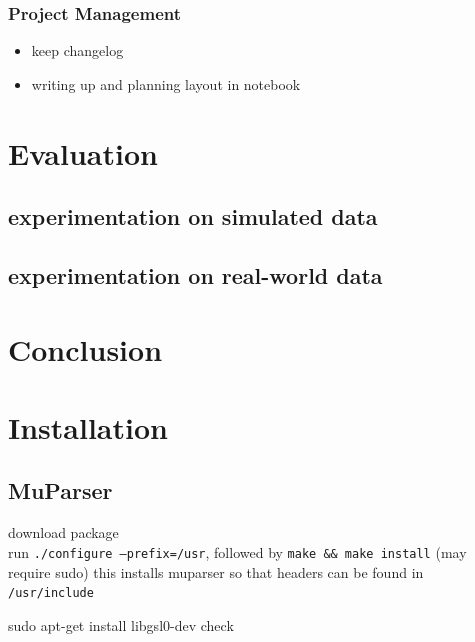 \documentclass[a4paper,11pt]{article}
\begin{document}
\subsubsection{Project Management}
\label{sec-6-2-3}

\begin{itemize}
\item keep changelog
\item writing up and planning layout in notebook
\end{itemize}
\section{Evaluation}
\label{sec-7}
\subsection{experimentation on simulated data}
\label{sec-7-1}
\subsection{experimentation on real-world data}
\label{sec-7-2}
\section{Conclusion}
\label{sec-8}

\newpage
\nocite{*}
\printbibliography
\newpage
\section{Installation}
\label{sec-9}
\subsection{MuParser}
\label{sec-9-1}

 download package\\
 run \texttt{./configure --prefix=/usr}, followed by \texttt{make \&\& make install} (may require sudo)
 this installs muparser so that headers can be found in \texttt{/usr/include}
    
    sudo apt-get install libgsl0-dev check 
\end{document}
